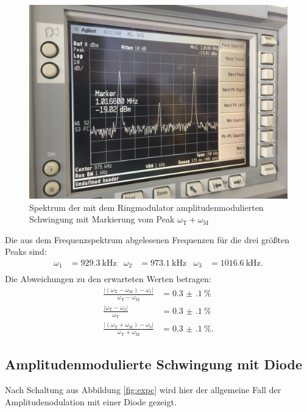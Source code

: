 \begin{figure}[h]
  \includegraphics[width=.9\textwidth]{Spektrum_Pics/b3.jpg}
  \caption{Spektrum der mit dem Ringmodulator amplitudenmodulierten Schwingung mit Markierung vom Peak $\omega_\text{T} + \omega_\text{M}$}
  \label{fig:b3}
\end{figure}

Die aus dem Frequenzspektrum abgelesenen Frequenzen für die drei größten Peaks sind:
\begin{align*}
  \omega_1 &= \SI{929.3}{\kilo\hertz} & \omega_2 &= \SI{973.1}{\kilo\hertz} & \omega_3 &= \SI{1016.6}{\kilo\hertz}.\\
\end{align*}
Die Abweichungen zu den erwarteten Werten betragen:
\begin{align*}
  \frac{|(\omega_\text{T} - \omega_\text{M}) - \omega_1|}{\omega_\text{T} - \omega_\text{M}} &= \SI{0.3(1)}{\percent}\\
  \frac{|\omega_\text{T} - \omega_2|}{\omega_\text{T}} &= \SI{0.3(1)}{\percent}\\
  \frac{|(\omega_\text{T} + \omega_\text{M}) - \omega_3|}{\omega_\text{T} + \omega_\text{M}} &= \SI{0.3(1)}{\percent}.
\end{align*}

\subsection{Amplitudenmodulierte Schwingung mit Diode}

Nach Schaltung aus Abbildung \ref{fig:expc} wird hier der allgemeine Fall der Amplitudenodulation mit einer Diode gezeigt.

